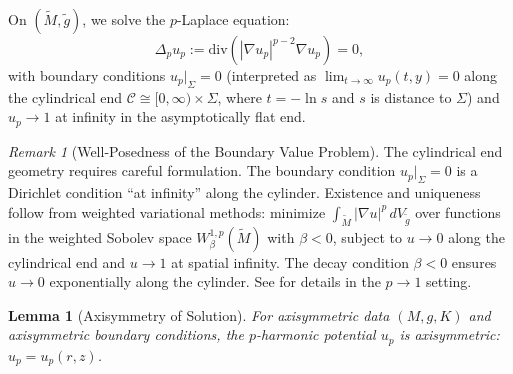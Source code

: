 \documentclass[12pt]{article}
\theoremstyle{plain}
\newtheorem{lemma}[theorem]{Lemma}
\theoremstyle{definition}
\theoremstyle{remark}
\newtheorem{remark}[theorem]{Remark}
\newcommand{\Div}{\mathrm{div}}
\newcommand{\tM}{\tilde{M}}
\newcommand{\tg}{\tilde{g}}
\begin{document}
On $(\tM, \tg)$, we solve the $p$-Laplace equation:
\begin{equation}
\Delta_p u_p := \Div(|\nabla u_p|^{p-2} \nabla u_p) = 0,
\end{equation}
with boundary conditions $u_p|_\Sigma = 0$ (interpreted as $\lim_{t \to \infty} u_p(t, y) = 0$ along the cylindrical end $\mathcal{C} \cong [0, \infty) \times \Sigma$, where $t = -\ln s$ and $s$ is distance to $\Sigma$) and $u_p \to 1$ at infinity in the asymptotically flat end.

\begin{remark}[Well-Posedness of the Boundary Value Problem]
The cylindrical end geometry requires careful formulation. The boundary condition $u_p|_\Sigma = 0$ is a Dirichlet condition ``at infinity'' along the cylinder. Existence and uniqueness follow from weighted variational methods: minimize $\int_{\tM} |\nabla u|^p \, dV_{\tg}$ over functions in the weighted Sobolev space $W^{1,p}_\beta(\tM)$ with $\beta < 0$, subject to $u \to 0$ along the cylindrical end and $u \to 1$ at spatial infinity. The decay condition $\beta < 0$ ensures $u \to 0$ exponentially along the cylinder. See \cite[Section 4]{amo2022} for details in the $p \to 1$ setting.
\end{remark}

\begin{lemma}[Axisymmetry of Solution]
For axisymmetric data $(M, g, K)$ and axisymmetric boundary conditions, the $p$-harmonic potential $u_p$ is axisymmetric: $u_p = u_p(r, z)$.
\end{lemma}
\end{document}
